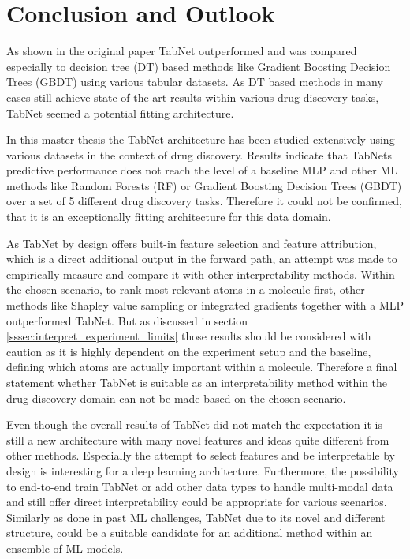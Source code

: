 \documentclass[../main.tex]{subfiles}
\begin{document}
\section{Conclusion and Outlook} \label{sec:conclusion}

As shown in the original paper \cite{arik_tabnet_2020} TabNet outperformed and was compared especially to decision tree (DT) based methods like Gradient Boosting Decision Trees (GBDT) using various tabular datasets. As DT based methods in many cases still achieve state of the art results within various drug discovery tasks, TabNet seemed a potential fitting architecture. 
\newline

In this master thesis the TabNet architecture has been studied extensively using various datasets in the context of drug discovery. Results indicate that TabNets predictive performance does not reach the level of a baseline MLP and other ML methods like Random Forests (RF) or Gradient Boosting Decision Trees (GBDT) over a set of 5 different drug discovery tasks. Therefore it could not be confirmed, that it is an exceptionally fitting architecture for this data domain. 
\newline

As TabNet by design offers built-in feature selection and feature attribution, which is a direct additional output in the forward path, an attempt was made to empirically measure and compare it with other interpretability methods. Within the chosen scenario, to rank most relevant atoms in a molecule first, other methods like Shapley value sampling or integrated gradients together with a MLP outperformed TabNet. But as discussed in section \ref{sssec:interpret_experiment_limits} those results should be considered with caution as it is highly dependent on the experiment setup and the baseline, defining which atoms are actually important within a molecule. Therefore a final statement whether TabNet is suitable as an interpretability method within the drug discovery domain can not be made based on the chosen scenario.
\newline

Even though the overall results of TabNet did not match the expectation it is still a new architecture with many novel features and ideas quite different from other methods. Especially the attempt to select features and be interpretable by design is interesting for a deep learning architecture. Furthermore, the possibility to end-to-end train TabNet or add other data types to handle multi-modal data and still offer direct interpretability could be appropriate for various scenarios. Similarly as done in past ML challenges, TabNet due to its novel and different structure, could be a suitable candidate for an additional method within an ensemble of ML models. 
\newline
\end{document}
